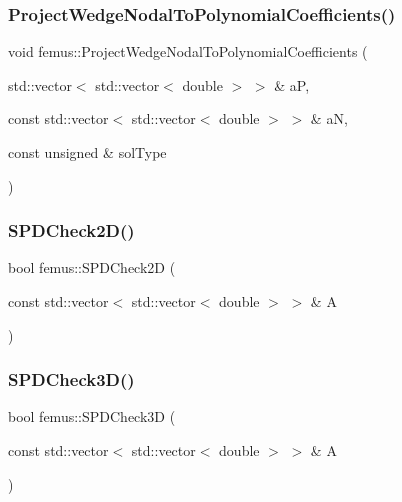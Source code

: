 \mbox{\label{namespacefemus_ab24f1a73deab6a1df822604fd544a505}} 
\subsubsection{\texorpdfstring{Project\+Wedge\+Nodal\+To\+Polynomial\+Coefficients()}{ProjectWedgeNodalToPolynomialCoefficients()}}
{\footnotesize\ttfamily void femus\+::\+Project\+Wedge\+Nodal\+To\+Polynomial\+Coefficients (\begin{DoxyParamCaption}\item[{std\+::vector$<$ std\+::vector$<$ double $>$ $>$ \&}]{aP,  }\item[{const std\+::vector$<$ std\+::vector$<$ double $>$ $>$ \&}]{aN,  }\item[{const unsigned \&}]{sol\+Type }\end{DoxyParamCaption})}

\mbox{\label{namespacefemus_a6f129a56e82b46e93ade54d62d1e216b}} 
\subsubsection{\texorpdfstring{S\+P\+D\+Check2\+D()}{SPDCheck2D()}}
{\footnotesize\ttfamily bool femus\+::\+S\+P\+D\+Check2D (\begin{DoxyParamCaption}\item[{const std\+::vector$<$ std\+::vector$<$ double $>$ $>$ \&}]{A }\end{DoxyParamCaption})}

\mbox{\label{namespacefemus_a874a88cde1f4ea068633b14801d54191}} 
\subsubsection{\texorpdfstring{S\+P\+D\+Check3\+D()}{SPDCheck3D()}}
{\footnotesize\ttfamily bool femus\+::\+S\+P\+D\+Check3D (\begin{DoxyParamCaption}\item[{const std\+::vector$<$ std\+::vector$<$ double $>$ $>$ \&}]{A }\end{DoxyParamCaption})}



